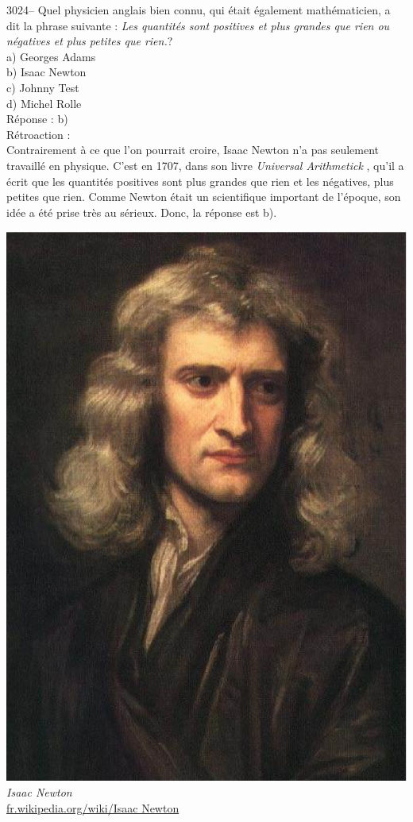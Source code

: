 \documentclass[letterpaper, 12pt]{article}
\begin{document}
3024-- Quel physicien anglais bien connu, qui \'etait \'egalement math\'ematicien, a dit la phrase suivante : \og \emph{Les quantit\'es sont positives et plus grandes que rien ou n\'egatives et plus petites que rien.}\fg?\\

a) Georges Adams\\
b) Isaac Newton\\
c) Johnny Test\\
d) Michel Rolle\\

R\'eponse : b)\\

R\'etroaction :\\
Contrairement \`a ce que l'on pourrait croire, Isaac Newton n'a pas seulement travaill\'e en physique. C'est en 1707, dans son livre \og \emph{Universal Arithmetick} \fg, qu'il a \'ecrit que les quantit\'es positives sont plus grandes que rien et les n\'egatives, plus petites que rien. Comme Newton \'etait un scientifique important de l'\'epoque, son id\'ee a \'et\'e prise tr\`es au s\'erieux. Donc, la r\'eponse est b).\\

\begin{center}
\includegraphics[scale=0.2]{IsaacNewton.eps}\\
\emph{{\small Isaac Newton}}\\
\href{http://fr.wikipedia.org/wiki/Isaac Newton}{fr.wikipedia.org/wiki/Isaac Newton}\\[5mm]
\end{center}
\end{document}
